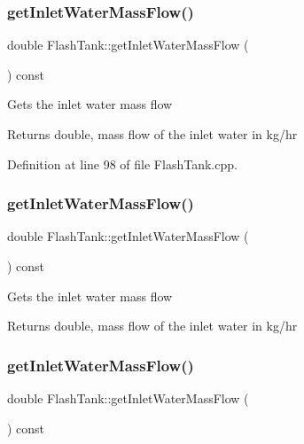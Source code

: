 \subsubsection{\texorpdfstring{get\+Inlet\+Water\+Mass\+Flow()}{getInletWaterMassFlow()}\hspace{0.1cm}{\footnotesize\ttfamily [1/3]}}
{\footnotesize\ttfamily double Flash\+Tank\+::get\+Inlet\+Water\+Mass\+Flow (\begin{DoxyParamCaption}{ }\end{DoxyParamCaption}) const}

Gets the inlet water mass flow \begin{DoxyReturn}{Returns}
double, mass flow of the inlet water in kg/hr 
\end{DoxyReturn}


Definition at line 98 of file Flash\+Tank.\+cpp.

\mbox{\label{class_flash_tank_a2b6dcd9e175a9f2fc550ea91006aa66a}} 
\subsubsection{\texorpdfstring{get\+Inlet\+Water\+Mass\+Flow()}{getInletWaterMassFlow()}\hspace{0.1cm}{\footnotesize\ttfamily [2/3]}}
{\footnotesize\ttfamily double Flash\+Tank\+::get\+Inlet\+Water\+Mass\+Flow (\begin{DoxyParamCaption}{ }\end{DoxyParamCaption}) const}

Gets the inlet water mass flow \begin{DoxyReturn}{Returns}
double, mass flow of the inlet water in kg/hr 
\end{DoxyReturn}
\mbox{\label{class_flash_tank_a2b6dcd9e175a9f2fc550ea91006aa66a}} 
\subsubsection{\texorpdfstring{get\+Inlet\+Water\+Mass\+Flow()}{getInletWaterMassFlow()}\hspace{0.1cm}{\footnotesize\ttfamily [3/3]}}
{\footnotesize\ttfamily double Flash\+Tank\+::get\+Inlet\+Water\+Mass\+Flow (\begin{DoxyParamCaption}{ }\end{DoxyParamCaption}) const}

